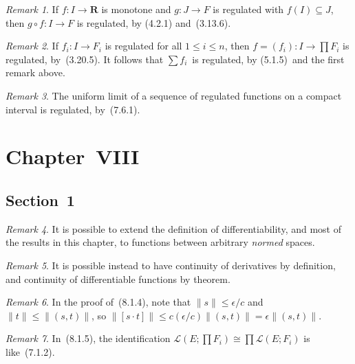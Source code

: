 \documentclass[letterpaper,12pt]{article}
\newcommand{\R}{\mathbf{R}}
\renewcommand{\L}{\mathcal{L}}
\newcommand{\after}{\circ}
\newcommand{\iso}{\cong}
\newcommand{\norm}[1]{\lVert{#1}\rVert}
\newcommand{\cbprod}[2]{[{#1}\cdot{#2}]}
\theoremstyle{plain}
\theoremstyle{definition}
\theoremstyle{remark}
\newtheorem*{rmk}{Remark}
\begin{document}
\begin{rmk}
If \(f:I\to\R\) is monotone and \(g:J\to F\) is regulated with \(f(I)\subseteq J\), then \(g\after f:I\to F\) is regulated, by (4.2.1) and~(3.13.6).
\end{rmk}

\begin{rmk}
If \(f_i:I\to F_i\) is regulated for all \(1\le i\le n\), then \(f=(f_i):I\to\prod F_i\) is regulated, by~(3.20.5). It follows that \(\sum f_i\)~is regulated, by (5.1.5)~and the first remark above.
\end{rmk}

\begin{rmk}
The uniform limit of a sequence of regulated functions on a compact interval is regulated, by~(7.6.1).
\end{rmk}

\section*{Chapter~VIII}
\subsection*{Section~1}
\begin{rmk}
It is possible to extend the definition of differentiability, and most of the results in this chapter, to functions between arbitrary \emph{normed} spaces.
\end{rmk}

\begin{rmk}
It is possible instead to have continuity of derivatives by definition, and continuity of differentiable functions by theorem.
\end{rmk}

\begin{rmk}
In the proof of~(8.1.4), note that \(\norm{s}\le\epsilon/c\) and \(\norm{t}\le\norm{(s,t)}\), so \(\norm{\cbprod{s}{t}}\le c(\epsilon/c)\norm{(s,t)}=\epsilon\norm{(s,t)}\).
\end{rmk}

\begin{rmk}
In~(8.1.5), the identification \(\L(E;\prod F_i)\iso\prod\L(E;F_i)\) is like~(7.1.2).
\end{rmk}
\end{document}
